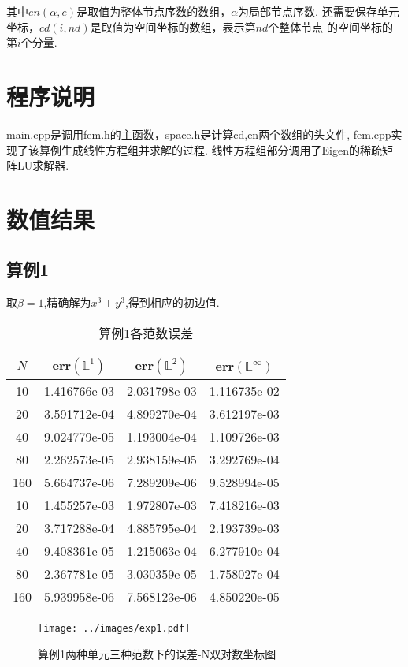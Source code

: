 \documentclass[a4paper, 11pt]{ctexart}
\newcommand\bbL{\mathbb{L}}
\begin{document}
其中$en(\alpha,e)$是取值为整体节点序数的数组，$\alpha$为局部节点序数.
还需要保存单元坐标，$cd(i,nd)$是取值为空间坐标的数组，表示第$nd$个整体节点
的空间坐标的第$i$个分量.

\section{程序说明}
main.cpp是调用fem.h的主函数，space.h是计算cd,en两个数组的头文件,
fem.cpp实现了该算例生成线性方程组并求解的过程.
线性方程组部分调用了Eigen的稀疏矩阵LU求解器.

\section{数值结果}
\subsection{算例1}
取$\beta=1$,精确解为$x^3+y^3$,得到相应的初边值.

\begin{table}[H]
	\centering
	\begin{tabular}{c|c|c|c}
		$N$ & err$(\bbL^1)$ & err$(\bbL^2)$ & err$(\bbL^\infty)$ \\ \hline
10 &1.416766e-03 &2.031798e-03 &1.116735e-02 \\
20 &3.591712e-04 &4.899270e-04 &3.612197e-03 \\
40 &9.024779e-05 &1.193004e-04 &1.109726e-03 \\
80 &2.262573e-05 &2.938159e-05 &3.292769e-04 \\
160&5.664737e-06 &7.289209e-06 &9.528994e-05 \\
\hline 
10 &1.455257e-03 &1.972807e-03 &7.418216e-03 \\
20 &3.717288e-04 &4.885795e-04 &2.193739e-03 \\
40 &9.408361e-05 &1.215063e-04 &6.277910e-04 \\
80 &2.367781e-05 &3.030359e-05 &1.758027e-04 \\
160&5.939958e-06 &7.568123e-06 &4.850220e-05 \\
	\end{tabular}
	\caption{算例1各范数误差}
	\label{tab:1}
\end{table}


\begin{figure}[H]
	\centering
	\texttt{[image: ../images/exp1.pdf]}
	\caption{算例1两种单元三种范数下的误差-N双对数坐标图}
	\label{fig:1}
\end{figure}
\end{document}

